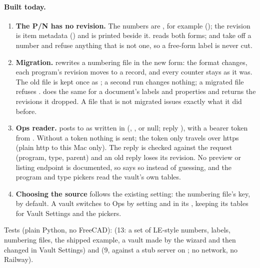 \paragraph{Built today.}
\begin{enumerate}[nosep]
  \item \textbf{The P/N has no revision.} The numbers are , for
        example  (); the revision is item metadata () and is printed beside it.
         reads both forms;  and  take
         off a number and refuse anything that is not one, so a free-form label is never cut.
  \item \textbf{Migration.}  rewrites a numbering file in the new form: the format
        changes, each program's revision moves to a  record, and every counter stays as it was. The old
        file is kept once as ; a second run changes nothing; a migrated file refuses
        .  does the same for a document's labels and 
        properties and returns the revisions it dropped. A file that is not migrated issues exactly what it did before.
  \item \textbf{Ops reader.}  posts to  as written
        in  (, ,  or null; reply
        ), with a bearer token from . Without a token nothing is sent; the
        token only travels over https (plain http to this Mac only). The reply is checked against the request
        (program, type, parent) and an old  reply loses its revision. No preview or listing endpoint is
        documented, so  says so instead of guessing, and the program and type pickers read the vault's
        own tables.
  \item \textbf{Choosing the source} follows the existing setting: the numbering file's  key, 
        by default. A vault switches to Ops by setting  and  in its
        , keeping its tables for Vault Settings and the pickers.
\end{enumerate}
Tests (plain Python, no FreeCAD):  (13: a set of LE-style numbers, labels,
numbering files, the shipped example, a vault made by the wizard and then changed in Vault Settings) and
 (9, against a stub server on ; no network, no Railway).

